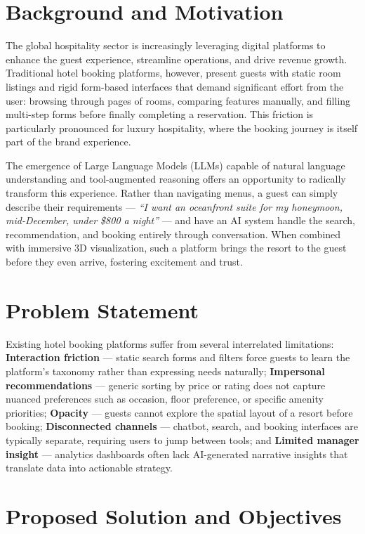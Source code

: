 \documentclass[11pt,a4paper]{report}
\begin{document}
\section{Background and Motivation}

The global hospitality sector is increasingly leveraging digital platforms to enhance the guest experience, streamline operations, and drive revenue growth. Traditional hotel booking platforms, however, present guests with static room listings and rigid form-based interfaces that demand significant effort from the user: browsing through pages of rooms, comparing features manually, and filling multi-step forms before finally completing a reservation. This friction is particularly pronounced for luxury hospitality, where the booking journey is itself part of the brand experience.

The emergence of Large Language Models (LLMs) capable of natural language understanding and tool-augmented reasoning offers an opportunity to radically transform this experience. Rather than navigating menus, a guest can simply describe their requirements — \emph{``I want an oceanfront suite for my honeymoon, mid-December, under \$800 a night''} — and have an AI system handle the search, recommendation, and booking entirely through conversation. When combined with immersive 3D visualization, such a platform brings the resort to the guest before they even arrive, fostering excitement and trust.

\section{Problem Statement}

Existing hotel booking platforms suffer from several interrelated limitations: \textbf{Interaction friction} — static search forms and filters force guests to learn the platform's taxonomy rather than expressing needs naturally; \textbf{Impersonal recommendations} — generic sorting by price or rating does not capture nuanced preferences such as occasion, floor preference, or specific amenity priorities; \textbf{Opacity} — guests cannot explore the spatial layout of a resort before booking; \textbf{Disconnected channels} — chatbot, search, and booking interfaces are typically separate, requiring users to jump between tools; and \textbf{Limited manager insight} — analytics dashboards often lack AI-generated narrative insights that translate data into actionable strategy.

\section{Proposed Solution and Objectives}
\end{document}
